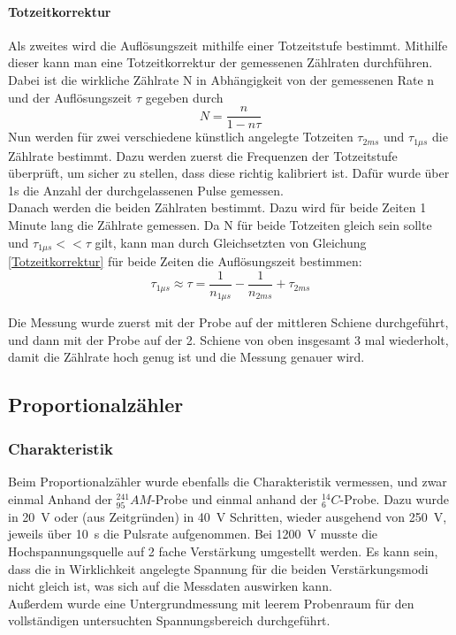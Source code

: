 \documentclass[12pt,a4paper]{article}
\begin{document}
\paragraph{Totzeitkorrektur}
Als zweites wird die Auflösungszeit mithilfe einer Totzeitstufe bestimmt. Mithilfe dieser kann man eine Totzeitkorrektur der gemessenen Zählraten durchführen. Dabei ist die wirkliche Zählrate N in Abhängigkeit von der gemessenen Rate n und der Auflösungszeit $\tau$ gegeben durch 
\begin{equation}
\label{Totzeitkorrektur}
N = \dfrac{n}{1-n\tau}
\end{equation}
Nun werden für zwei verschiedene künstlich angelegte Totzeiten $\tau_{2ms}$ und $\tau_{1\mu s}$ die Zählrate bestimmt. Dazu werden zuerst die Frequenzen der Totzeitstufe überprüft, um sicher zu stellen, dass diese richtig kalibriert ist. Dafür wurde über 1s die Anzahl der durchgelassenen Pulse gemessen.\\
Danach werden die beiden Zählraten bestimmt. Dazu wird für beide Zeiten 1 Minute lang die Zählrate gemessen. Da N für beide Totzeiten gleich sein sollte und $\tau_{1\mu s} << \tau$ gilt, kann man durch Gleichsetzten von Gleichung \ref{Totzeitkorrektur} für beide Zeiten die Auflösungszeit bestimmen:
\begin{equation}
\tau_{1\mu s} \approx \tau = \dfrac{1}{n_{1\mu s}} - \dfrac{1}{n_{2ms}} + \tau_{2ms}
\label{Auslosungszeit}
\end{equation}

Die Messung wurde zuerst mit der Probe auf der mittleren Schiene durchgeführt, und dann mit der Probe auf der 2. Schiene von oben insgesamt 3 mal wiederholt, damit die Zählrate hoch genug ist und die Messung genauer wird.
\subsection{Proportionalzähler}

\subsubsection{Charakteristik}
Beim Proportionalzähler wurde ebenfalls die Charakteristik vermessen, und zwar einmal Anhand der $_{95}^{241}AM$-Probe und einmal anhand der $_6^{14}C$-Probe. Dazu wurde in \SI{20}{V} oder (aus Zeitgründen) in \SI{40}{V} Schritten, wieder ausgehend von \SI{250}{V}, jeweils über \SI{10}{s} die Pulsrate aufgenommen. Bei \SI{1200}{V} musste die Hochspannungsquelle auf 2 fache Verstärkung umgestellt werden. Es kann sein, dass die in Wirklichkeit angelegte Spannung für die beiden Verstärkungsmodi nicht gleich ist, was sich auf die Messdaten auswirken kann.\\
Außerdem wurde eine Untergrundmessung mit leerem Probenraum für den vollständigen untersuchten Spannungsbereich durchgeführt.
\end{document}
